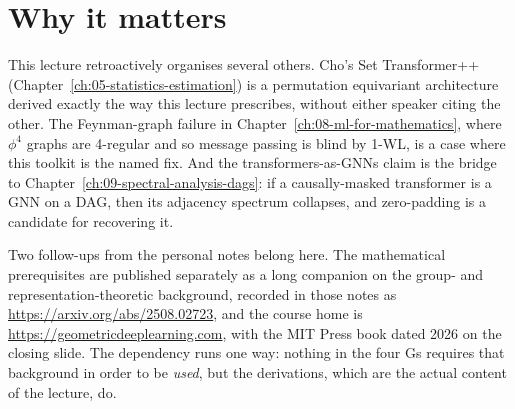 \section*{Why it matters}

This lecture retroactively organises several others. Cho's Set Transformer++ (Chapter~\ref{ch:05-statistics-estimation}) is a permutation
equivariant architecture derived exactly the way this lecture prescribes, without either speaker
citing the other. The Feynman-graph failure in
Chapter~\ref{ch:08-ml-for-mathematics}, where $\phi^4$ graphs are 4-regular and so message passing
is blind by 1-WL, is a case where this toolkit is the named fix. And the transformers-as-GNNs claim
is the bridge to Chapter~\ref{ch:09-spectral-analysis-dags}: if a causally-masked transformer is a
GNN on a DAG, then its adjacency spectrum collapses, and zero-padding is a candidate for
recovering it.

\begin{aside}
Two follow-ups from the personal notes belong here. The mathematical prerequisites are published
separately as a long companion on the group- and representation-theoretic background, recorded in
those notes as \url{https://arxiv.org/abs/2508.02723}, and the course home is
\url{https://geometricdeeplearning.com}, with the MIT Press book dated 2026 on the closing slide.
The dependency runs one way: nothing in the four Gs requires that background in order to be
\emph{used}, but the derivations, which are the actual content of the lecture, do.
\end{aside}
